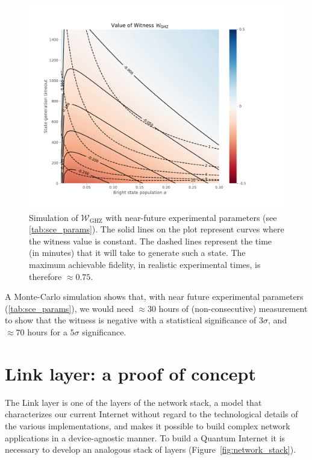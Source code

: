 \documentclass[a4paper]{article}
\begin{document}
\begin{figure}
	\includegraphics[width=\textwidth, trim=1cm 1cm 3cm 1cm 0cm]{../images/witness.pdf}
	\caption{Simulation of $\mathcal W_\text{GHZ}$ with near-future experimental parameters (see \autoref{tab:sce_params}). The solid lines on the plot represent curves where the witness value is constant. The dashed lines represent the time (in minutes) that it will take to generate such a state. The maximum achievable fidelity, in realistic experimental times, is therefore $\approx 0.75$.}
	\label{fig:witness}
\end{figure}

A Monte-Carlo simulation shows that, with near future experimental parameters (\autoref{tab:sce_params}), we would need $\approx 30$ hours of (non-consecutive) measurement to show that the witness is negative with a statistical significance of $3\sigma$, and $\approx 70$ hours for a $5\sigma$ significance.

\section{Link layer: a proof of concept}
\label{sec:link}

The Link layer is one of the layers of the network stack, a model that characterizes our current Internet without regard to the technological details of the various implementations, and makes it possible to build complex network applications in a device-agnostic manner. To build a Quantum Internet it is necessary to develop an analogous stack of layers (Figure~\ref{fig:network_stack}). 
\end{document}
